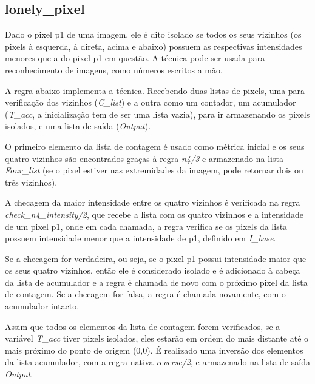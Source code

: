 \documentclass{article}
\begin{document}
    \newpage
    \subsection*{lonely\_pixel}
        Dado o pixel p1 de uma imagem, ele é dito isolado se todos os seus
        vizinhos (os pixels à esquerda, à direta, acima e abaixo) possuem as
        respectivas intensidades menores que a do pixel p1 em questão. A
        técnica pode ser usada para reconhecimento de imagens, como números
        escritos a mão.

        A regra abaixo implementa a técnica. Recebendo duas listas de pixels,
        uma para verificação dos vizinhos (\textit{C\_list}) e a outra como um
        contador, um acumulador (\textit{T\_acc}, a inicialização tem de ser
        uma lista vazia), para ir armazenando os pixels isolados, e uma lista
        de saída (\textit{Output}).
        
        O primeiro elemento da lista de contagem é usado como métrica inicial e
        os seus quatro vizinhos são encontrados graças à regra \textit{n4/3} e
        armazenado na lista \textit{Four\_list} (se o pixel estiver nas
        extremidades da imagem, pode retornar dois ou três vizinhos).
        
        A checagem da maior intensidade entre os quatro vizinhos é verificada
        na regra \textit{check\_n4\_intensity/2}, que recebe a lista com os
        quatro vizinhos e a intensidade de um pixel p1, onde em cada chamada, a
        regra verifica se os pixels da lista possuem intensidade menor que a
        intensidade de p1, definido em \textit{I\_base}.
        
        Se a checagem for verdadeira, ou seja, se o pixel p1 possui intensidade
        maior que os seus quatro vizinhos, então ele é considerado isolado e é
        adicionado à cabeça da lista de acumulador e a regra é chamada de novo
        com o próximo pixel da lista de contagem. Se a checagem for falsa, a
        regra é chamada novamente, com o acumulador intacto.

        Assim que todos os elementos da lista de contagem forem verificados, se
        a variável \textit{T\_acc} tiver pixels isolados, eles estarão em ordem
        do mais distante até o mais próximo do ponto de origem (0,0). É
        realizado uma inversão dos elementos da lista acumulador, com a regra
        nativa \textit{reverse/2}, e armazenado na lista de saída
        \textit{Output}.
\end{document}
